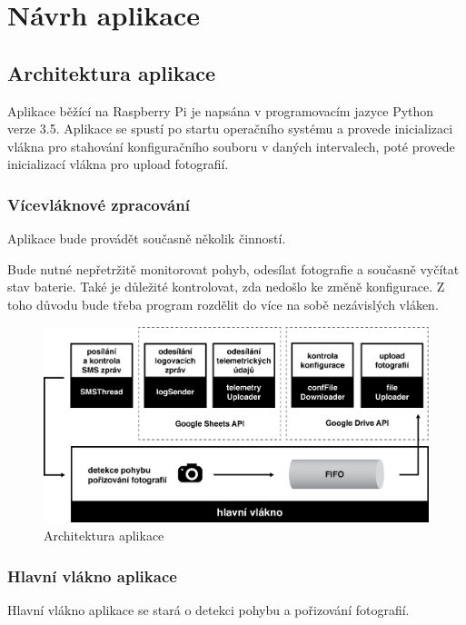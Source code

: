 
\chapter{Návrh aplikace}
\section{Architektura aplikace}

Aplikace běžící na Raspberry Pi je napsána v programovacím jazyce Python verze 3.5. Aplikace se spustí po startu operačního systému a provede inicializaci vlákna pro stahování konfiguračního souboru v daných intervalech, poté provede inicializací vlákna pro upload fotografií.

\subsection*{Vícevláknové zpracování}
Aplikace bude provádět současně několik činností.

Bude nutné nepřetržitě monitorovat pohyb, odesílat fotografie a současně vyčítat stav baterie. Také je důležité kontrolovat, zda nedošlo ke změně konfigurace. Z toho důvodu bude třeba program rozdělit do více na sobě nezávislých vláken.

\begin{figure}[h]
  \begin{center}
    \includegraphics[scale=0.5]{obrazky/schema_aplikace.png}
  \end{center}
  \caption{Architektura aplikace}
\end{figure}

\subsection*{Hlavní vlákno aplikace}
Hlavní vlákno aplikace se stará o detekci pohybu a pořizování fotografií.

